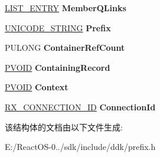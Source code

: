 \begin{DoxyCompactItemize}
\hyperlink{struct___l_i_s_t___e_n_t_r_y}{L\+I\+S\+T\+\_\+\+E\+N\+T\+RY} {\bfseries Member\+Q\+Links}
\item 
\mbox{\label{struct___r_x___p_r_e_f_i_x___e_n_t_r_y_a5f2ae65bf6591ff771a3515315f7f3de}} 
\hyperlink{struct___u_n_i_c_o_d_e___s_t_r_i_n_g}{U\+N\+I\+C\+O\+D\+E\+\_\+\+S\+T\+R\+I\+NG} {\bfseries Prefix}
\item 
\mbox{\label{struct___r_x___p_r_e_f_i_x___e_n_t_r_y_ac640dadcc0e303f2a6849cdf101f540c}} 
P\+U\+L\+O\+NG {\bfseries Container\+Ref\+Count}
\item 
\mbox{\label{struct___r_x___p_r_e_f_i_x___e_n_t_r_y_a668f27c53f13908cd6867b32a6b84ace}} 
\hyperlink{interfacevoid}{P\+V\+O\+ID} {\bfseries Containing\+Record}
\item 
\mbox{\label{struct___r_x___p_r_e_f_i_x___e_n_t_r_y_a4cbf64296c1f7f9d91cd97a02e01677f}} 
\hyperlink{interfacevoid}{P\+V\+O\+ID} {\bfseries Context}
\item 
\mbox{\label{struct___r_x___p_r_e_f_i_x___e_n_t_r_y_a7c0e3d25585001806dec96278e8490be}} 
\hyperlink{struct___r_x___c_o_n_n_e_c_t_i_o_n___i_d}{R\+X\+\_\+\+C\+O\+N\+N\+E\+C\+T\+I\+O\+N\+\_\+\+ID} {\bfseries Connection\+Id}
\end{DoxyCompactItemize}


该结构体的文档由以下文件生成\+:\begin{DoxyCompactItemize}
\item 
E\+:/\+React\+O\+S-\/0../sdk/include/ddk/prefix.\+h\end{DoxyCompactItemize}
